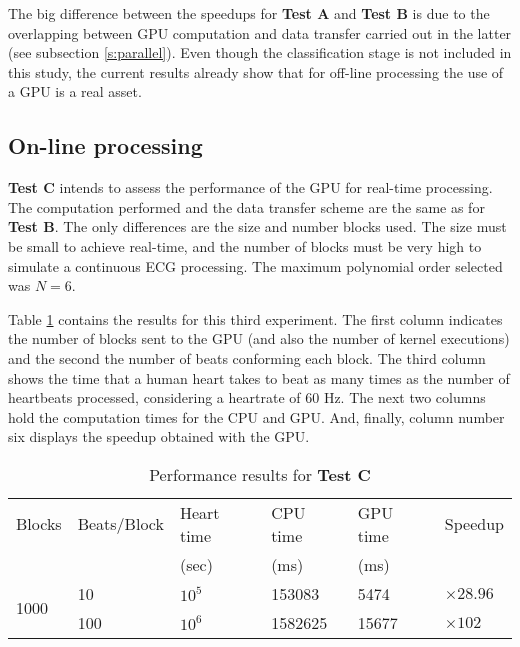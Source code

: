 \documentclass[runningheads]{llncs}
\begin{document}
The big difference between the speedups for \textbf{Test A} and \textbf{Test B} is due to the overlapping between GPU computation and data transfer carried out in the latter (see subsection \ref{s:parallel}). Even though the classification stage is not included in this study, the current results already show that for off-line processing the use of a GPU is a real asset. 


\subsection{On-line processing}\label{ss:online}
\textbf{Test C} intends to assess the performance of the GPU for real-time processing. The computation performed and the data transfer scheme are the same as for \textbf{Test B}. The only differences are the size and number blocks used. The size must be small to achieve real-time, and the number of blocks must be very high to simulate a continuous ECG processing. The maximum polynomial order selected was $N=6$.

Table \ref{tab:C} contains the results for this third experiment. The first column indicates the number of blocks sent to the GPU (and also the number of kernel executions) and the second the number of beats conforming each block. The third column shows the time that a human heart takes to beat as many times as the number of heartbeats processed, considering a heartrate of 60 Hz. The next two columns hold the computation times for the CPU and GPU. And, finally, column number six displays the speedup obtained with the GPU.

\begin{table}[h]
\caption{Performance results for \textbf{Test C}}\label{tab:C}
\begin{minipage}[b]{\columnwidth}\centering
\renewcommand{\arraystretch}{1.2}
\begin{center}
\begin{tabular}{p{1 cm} p{2 cm} p{2 cm} p{2 cm} p{1 cm} p{1cm}}
Blocks & Beats/Block & Heart time & CPU time & GPU time & Speedup\\
      &     & (sec) & (ms) & (ms) & \\\hline
\multirow{2}{*}{1000} & 10 & $10^5$ & 153083 & 5474 & $\times 28.96$ \\
 & 100 & $10^6$ & 1582625 & 15677 & $\times 102$ \\
\end{tabular}
\end{center}
\end{minipage}
\end{table}
\end{document}

